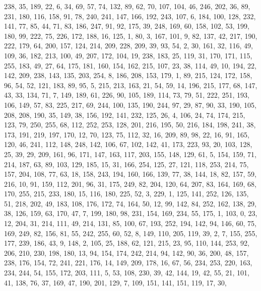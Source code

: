 \begin{DoxyCode}
       238, 35, 189, 22, 6, 34, 69, 57, 74, 132, 89, 62, 70, 107, 104, 46, 246, 202, 36, 89, 231, 180, 116, 158,
       91, 78, 240, 241, 147, 166, 192, 243, 107, 6, 184, 100, 128, 232, 141, 77, 85, 44, 71, 83, 186, 247, 91, 92,
       175, 39, 248, 169, 60, 158, 102, 53, 199, 180, 99, 222, 75, 226, 172, 188, 16, 125, 1, 80, 3, 167, 101, 9,
       82, 137, 42, 217, 190, 222, 179, 64, 200, 157, 124, 214, 209, 228, 209, 39, 93, 54, 2, 30, 161, 32, 116, 49,
       109, 36, 182, 213, 100, 49, 207, 172, 104, 19, 238, 183, 25, 119, 31, 170, 171, 115, 255, 183, 49, 27, 64,
       175, 181, 160, 154, 162, 215, 107, 23, 38, 114, 49, 10, 194, 22, 142, 209, 238, 143, 135, 203, 254, 8, 186,
       208, 153, 179, 1, 89, 215, 124, 172, 158, 96, 54, 52, 121, 183, 89, 95, 5, 215, 213, 163, 21, 54, 59, 14,
       196, 215, 177, 68, 147, 43, 33, 134, 71, 7, 149, 189, 61, 226, 90, 105, 189, 114, 73, 79, 51, 222, 251, 193,
       106, 149, 57, 83, 225, 217, 69, 244, 100, 135, 190, 244, 97, 29, 87, 90, 33, 190, 105, 208, 208, 190, 35, 149,
       38, 156, 192, 141, 232, 125, 26, 4, 106, 24, 74, 174, 215, 123, 79, 250, 255, 68, 112, 252, 253, 128, 201,
       216, 195, 50, 216, 184, 198, 241, 38, 173, 191, 219, 197, 170, 12, 70, 123, 75, 112, 32, 16, 209, 89, 98,
       22, 16, 91, 165, 120, 46, 241, 112, 148, 248, 142, 106, 67, 102, 142, 41, 173, 223, 93, 20, 103, 128, 25, 39,
       29, 209, 161, 96, 171, 147, 163, 117, 203, 155, 148, 129, 61, 5, 154, 159, 71, 214, 187, 63, 89, 103, 129,
       185, 15, 31, 166, 254, 125, 27, 121, 118, 253, 214, 75, 157, 204, 108, 77, 63, 18, 158, 243, 194, 160, 166,
       139, 77, 38, 144, 18, 82, 157, 59, 216, 10, 91, 159, 112, 201, 96, 31, 175, 249, 82, 204, 120, 64, 207, 83,
       164, 169, 68, 170, 255, 215, 233, 180, 15, 116, 180, 225, 52, 3, 229, 1, 125, 141, 252, 126, 135, 51, 218,
       202, 49, 183, 108, 176, 172, 74, 164, 50, 12, 99, 142, 84, 252, 162, 138, 29, 38, 126, 159, 63, 170, 47, 7,
       199, 180, 98, 231, 154, 169, 234, 55, 175, 1, 103, 0, 23, 12, 204, 31, 214, 111, 49, 214, 131, 85, 100, 67,
       193, 252, 194, 142, 94, 146, 60, 75, 169, 249, 82, 156, 81, 55, 242, 255, 60, 52, 8, 149, 110, 205, 119, 39,
       2, 7, 155, 255, 177, 239, 186, 43, 9, 148, 2, 105, 25, 188, 62, 121, 215, 23, 95, 110, 144, 253, 92, 206,
       210, 230, 198, 180, 13, 94, 154, 174, 242, 214, 94, 142, 90, 36, 200, 48, 157, 238, 176, 154, 72, 241, 221,
       176, 14, 149, 209, 178, 16, 67, 56, 234, 253, 220, 163, 234, 244, 54, 155, 172, 203, 111, 5, 53, 108, 230, 39,
       42, 144, 19, 42, 55, 21, 101, 41, 138, 76, 37, 169, 47, 190, 201, 129, 7, 109, 151, 141, 151, 119, 17, 30,

\end{DoxyCode}
